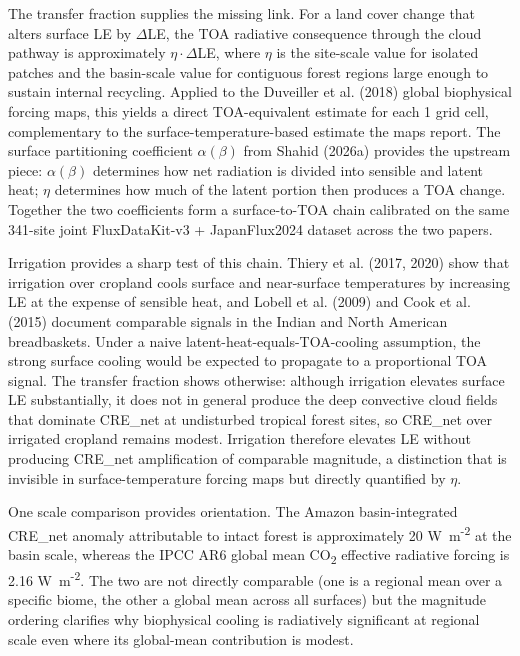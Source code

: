 The transfer fraction supplies the missing link. For a land cover change that alters surface LE by \(\Delta\)LE, the TOA radiative consequence through the cloud pathway is approximately \(\eta \cdot \Delta\)LE, where \(\eta\) is the site-scale value for isolated patches and the basin-scale value for contiguous forest regions large enough to sustain internal recycling. Applied to the Duveiller et al. (2018) global biophysical forcing maps, this yields a direct TOA-equivalent estimate for each 1\textdegree{} grid cell, complementary to the surface-temperature-based estimate the maps report. The surface partitioning coefficient \(\alpha(\beta)\) from Shahid (2026a) provides the upstream piece: \(\alpha(\beta)\) determines how net radiation is divided into sensible and latent heat; \(\eta\) determines how much of the latent portion then produces a TOA change. Together the two coefficients form a surface-to-TOA chain calibrated on the same 341-site joint FluxDataKit-v3 + JapanFlux2024 dataset across the two papers.

Irrigation provides a sharp test of this chain. Thiery et al. (2017, 2020) show that irrigation over cropland cools surface and near-surface temperatures by increasing LE at the expense of sensible heat, and Lobell et al. (2009) and Cook et al. (2015) document comparable signals in the Indian and North American breadbaskets. Under a naive latent-heat-equals-TOA-cooling assumption, the strong surface cooling would be expected to propagate to a proportional TOA signal. The transfer fraction shows otherwise: although irrigation elevates surface LE substantially, it does not in general produce the deep convective cloud fields that dominate CRE\_net at undisturbed tropical forest sites, so CRE\_net over irrigated cropland remains modest. Irrigation therefore elevates LE without producing CRE\_net amplification of comparable magnitude, a distinction that is invisible in surface-temperature forcing maps but directly quantified by \(\eta\).

One scale comparison provides orientation. The Amazon basin-integrated CRE\_net anomaly attributable to intact forest is approximately 20 W~m\textsuperscript{-2} at the basin scale, whereas the IPCC AR6 global mean CO\textsubscript{2} effective radiative forcing is 2.16 W~m\textsuperscript{-2}. The two are not directly comparable (one is a regional mean over a specific biome, the other a global mean across all surfaces) but the magnitude ordering clarifies why biophysical cooling is radiatively significant at regional scale even where its global-mean contribution is modest.

